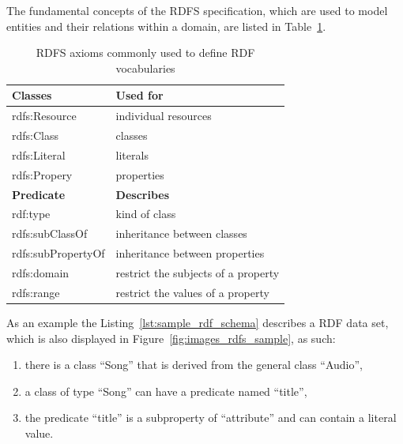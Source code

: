 The fundamental concepts of the \gls{RDFS} specification, which are used to model entities and their relations within a domain, are listed in Table~\ref{tab:w3c_vocab_rdfs}.

\begin{table}[H]
\centering
\begin{tabular}{p{5cm}p{7cm}}
\hline
\textbf{Classes} & \textbf{Used for} \\
\hline
rdfs:Resource & individual resources \\
\hline
rdfs:Class & classes \\
\hline
rdfs:Literal & literals \\
\hline
rdfs:Propery & properties \\
\hline
\textbf{Predicate} & \textbf{Describes} \\
\hline
rdf:type	& kind of class \\
\hline
rdfs:subClassOf 	&	inheritance between classes \\
\hline
rdfs:subPropertyOf 	& inheritance between properties \\
\hline
rdfs:domain	&	restrict the subjects of a property \\
\hline
rdfs:range  & restrict the values of a property \\
\hline
\end{tabular}
\caption[\gls{RDFS} axioms commonly used to define \gls{RDF} vocabularies]{\gls{RDFS} axioms commonly used to define \gls{RDF} vocabularies \citep[pg. 46-49]{antoniou2012semantic}}
\label{tab:w3c_vocab_rdfs}
\end{table}

As an example the Listing~\ref{lst:sample_rdf_schema} describes a \gls{RDF} data set, which is also displayed in Figure~\ref{fig:images_rdfs_sample}, as such: \@

\begin{enumerate}
	\item there is a class ``Song'' that is derived from the general class ``Audio'',
	\item a class of type ``Song'' can have a predicate named ``title'',
	\item the predicate ``title'' is a subproperty of ``attribute'' and can contain a literal value.
\end{enumerate}



